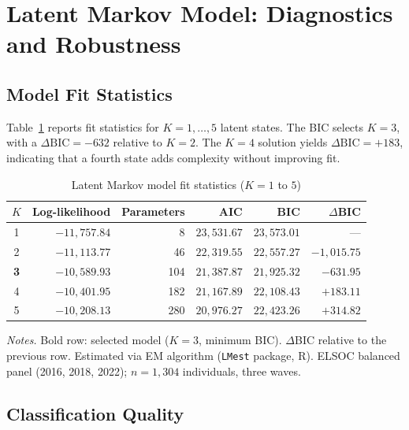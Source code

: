 \documentclass[12pt, a4paper]{article}
\newcommand{\tablenote}[1]{\vspace{4pt}\par\footnotesize\textit{Notes.} #1}
\begin{document}
\section{Latent Markov Model: Diagnostics and Robustness}
\label{sec:lmm}

\subsection{Model Fit Statistics}

Table~\ref{tab:A2_lmm_fit} reports fit statistics for $K = 1, \ldots, 5$
latent states. The BIC selects $K = 3$, with a $\Delta\text{BIC} = -632$
relative to $K = 2$. The $K = 4$ solution yields $\Delta\text{BIC} = +183$,
indicating that a fourth state adds complexity without improving fit.

\begin{table}[H]
\centering
\caption{Latent Markov model fit statistics ($K = 1$ to $5$)}
\label{tab:A2_lmm_fit}
\small
\begin{tabular}{crrrrr}
\hline\hline
  $K$ & Log-likelihood & Parameters & AIC & BIC & $\Delta$BIC \\
\hline
  1              & $-11{,}757.84$ &   8 & $23{,}531.67$ & $23{,}573.01$ & ---     \\
  2              & $-11{,}113.77$ &  46 & $22{,}319.55$ & $22{,}557.27$ & $-1{,}015.75$ \\
  \textbf{3}     & $-10{,}589.93$ & 104 & $21{,}387.87$ & $21{,}925.32$ & $-631.95$ \\
  4              & $-10{,}401.95$ & 182 & $21{,}167.89$ & $22{,}108.43$ & $+183.11$ \\
  5              & $-10{,}208.13$ & 280 & $20{,}976.27$ & $22{,}423.26$ & $+314.82$ \\
\hline\hline
\end{tabular}
\tablenote{Bold row: selected model ($K = 3$, minimum BIC).
$\Delta$BIC relative to the previous row.
Estimated via EM algorithm (\texttt{LMest} package, R).
ELSOC balanced panel (2016, 2018, 2022); $n = 1{,}304$ individuals,
three waves.}
\end{table}

\subsection{Classification Quality}
\end{document}
